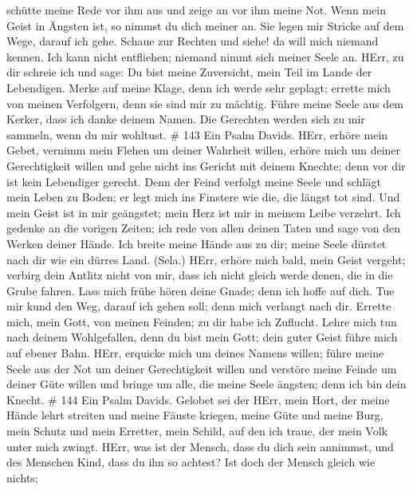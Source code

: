 schütte meine Rede vor ihm aus und zeige an vor ihm meine Not.
 Wenn mein Geist in Ängsten ist, so nimmst du dich meiner
an. Sie legen mir Stricke auf dem Wege, darauf ich gehe. 
Schaue zur Rechten und siehe! da will mich niemand kennen. Ich kann
nicht entfliehen; niemand nimmt sich meiner Seele an.  HErr,
zu dir schreie ich und sage: Du bist meine Zuversicht, mein Teil im
Lande der Lebendigen.  Merke auf meine Klage, denn ich werde
sehr geplagt; errette mich von meinen Verfolgern, denn sie sind mir zu
mächtig.  Führe meine Seele aus dem Kerker, dass ich danke
deinem Namen. Die Gerechten werden sich zu mir sammeln, wenn du mir
wohltust. \# 143  Ein Psalm Davids. HErr, erhöre mein Gebet,
vernimm mein Flehen um deiner Wahrheit willen, erhöre mich um deiner
Gerechtigkeit willen  und gehe nicht ins Gericht mit deinem
Knechte; denn vor dir ist kein Lebendiger gerecht.  Denn der
Feind verfolgt meine Seele und schlägt mein Leben zu Boden; er legt mich
ins Finstere wie die, die längst tot sind.  Und mein Geist
ist in mir geängstet; mein Herz ist mir in meinem Leibe verzehrt.
 Ich gedenke an die vorigen Zeiten; ich rede von allen
deinen Taten und sage von den Werken deiner Hände.  Ich
breite meine Hände aus zu dir; meine Seele dürstet nach dir wie ein
dürres Land. (Sela.)  HErr, erhöre mich bald, mein Geist
vergeht; verbirg dein Antlitz nicht von mir, dass ich nicht gleich werde
denen, die in die Grube fahren.  Lass mich frühe hören deine
Gnade; denn ich hoffe auf dich. Tue mir kund den Weg, darauf ich gehen
soll; denn mich verlangt nach dir.  Errette mich, mein Gott,
von meinen Feinden; zu dir habe ich Zuflucht.  Lehre mich
tun nach deinem Wohlgefallen, denn du bist mein Gott; dein guter Geist
führe mich auf ebener Bahn.  HErr, erquicke mich um deines
Namens willen; führe meine Seele aus der Not um deiner Gerechtigkeit
willen  und verstöre meine Feinde um deiner Güte willen und
bringe um alle, die meine Seele ängsten; denn ich bin dein Knecht. \#
144  Ein Psalm Davids. Gelobet sei der HErr, mein Hort, der
meine Hände lehrt streiten und meine Fäuste kriegen,  meine
Güte und meine Burg, mein Schutz und mein Erretter, mein Schild, auf den
ich traue, der mein Volk unter mich zwingt.  HErr, was ist
der Mensch, dass du dich sein annimmst, und des Menschen Kind, dass du
ihn so achtest?  Ist doch der Mensch gleich wie nichts;
